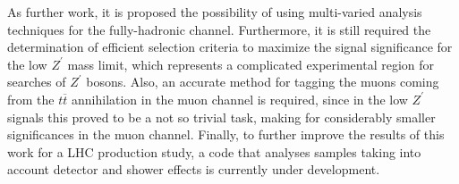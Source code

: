 As further work, it is proposed the possibility of using multi-varied analysis techniques for the fully-hadronic channel. Furthermore, it is still required the determination of efficient selection criteria to maximize the signal significance for the low $Z^{\prime}$ mass limit, which represents a complicated experimental region for searches of $Z^{\prime}$ bosons. Also, an accurate method for tagging the muons coming from the $t\overline t$ annihilation in the muon channel is required, since in the low $Z^{\prime}$ signals this proved to be a not so trivial task, making for considerably smaller significances in the muon channel. Finally, to further improve the results of this work for a LHC production study, a code that analyses samples taking into account detector and shower effects is currently under development.